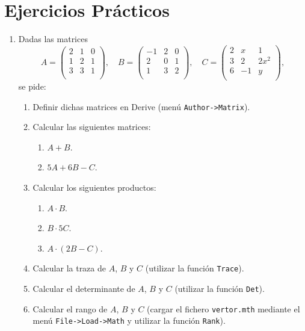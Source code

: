 \documentclass[a4paper]{article}
\begin{document}
\section*{Ejercicios Prácticos}
\begin{enumerate}[leftmargin=*]
\item Dadas las matrices
\[
A=\left(
\begin{array}{rrr}
 2 & 1 & 0 \\
 1 & 2 & 1 \\
 3 & 3 & 1 \\
\end{array}
\right),
\quad
B=\left(
\begin{array}{rrr}
 -1 & 2 & 0 \\
  2 & 0 & 1 \\
  1 & 3 & 2 \\
\end{array}
\right),
\quad
C=\left(
\begin{array}{rrr}
 2 &  x &    1 \\
 3 &  2 & 2x^2 \\
 6 & -1 &    y \\
\end{array}
\right),
\]
se pide:

\begin{enumerate}
\item Definir dichas matrices en Derive (menú \texttt{Author->Matrix}).
\item Calcular las siguientes matrices:
\begin{enumerate}
\item $A+B$.
\item $5A+6B-C$. 
\end{enumerate}
\item Calcular los siguientes productos:
\begin{enumerate}
\item $A\cdot B$.
\item $B\cdot 5C$.
\item $A\cdot(2B-C)$.
\end{enumerate}

\item Calcular la traza de $A$, $B$ y $C$ (utilizar la función \texttt{Trace}).

\item Calcular el determinante de $A$, $B$ y $C$ (utilizar la función \texttt{Det}).

\item Calcular el rango de $A$, $B$ y $C$ (cargar el fichero \texttt{vertor.mth} mediante el menú \texttt{File->Load->Math} y utilizar la función \texttt{Rank}).


\end{enumerate}
\end{enumerate}
\end{document}
